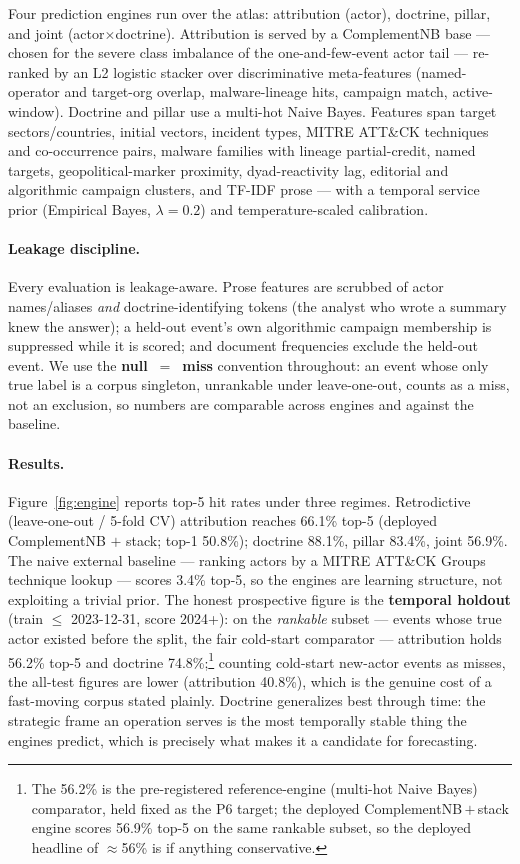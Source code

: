 \documentclass[11pt]{article}
\begin{document}
Four prediction engines run over the atlas: attribution (actor), doctrine, pillar, and joint
(actor$\times$doctrine). Attribution is served by a ComplementNB base \citep{rennie2003} --- chosen for
the severe class imbalance of the one-and-few-event actor tail --- re-ranked by an L2 logistic stacker
over discriminative meta-features (named-operator and target-org overlap, malware-lineage hits, campaign
match, active-window). Doctrine and pillar use a multi-hot Naive Bayes. Features span target
sectors/countries, initial vectors, incident types, MITRE ATT\&CK techniques \citep{mitreattack} and co-occurrence pairs,
malware families with lineage partial-credit, named targets, geopolitical-marker proximity,
dyad-reactivity lag, editorial and algorithmic campaign clusters, and TF-IDF prose --- with a temporal
service prior (Empirical Bayes, $\lambda=0.2$) and temperature-scaled calibration.

\paragraph{Leakage discipline.} Every evaluation is leakage-aware. Prose features are scrubbed of actor
names/aliases \emph{and} doctrine-identifying tokens (the analyst who wrote a summary knew the answer);
a held-out event's own algorithmic campaign membership is suppressed while it is scored; and document
frequencies exclude the held-out event. We use the \textbf{null~$=$~miss} convention throughout: an
event whose only true label is a corpus singleton, unrankable under leave-one-out, counts as a miss,
not an exclusion, so numbers are comparable across engines and against the baseline.

\paragraph{Results.} Figure~\ref{fig:engine} reports top-5 hit rates under three regimes. Retrodictive
(leave-one-out / 5-fold CV) attribution reaches 66.1\% top-5 (deployed ComplementNB $+$ stack; top-1
50.8\%); doctrine 88.1\%, pillar 83.4\%, joint 56.9\%. The naive external baseline --- ranking actors by
a MITRE ATT\&CK Groups technique lookup --- scores 3.4\% top-5, so the engines are learning structure,
not exploiting a trivial prior. The honest prospective figure is the \textbf{temporal holdout} (train
$\le$ 2023-12-31, score 2024+): on the \emph{rankable} subset --- events whose true actor existed before
the split, the fair cold-start comparator --- attribution holds 56.2\% top-5 and doctrine 74.8\%;\footnote{The 56.2\% is the pre-registered reference-engine (multi-hot Naive Bayes) comparator, held fixed as the P6 target; the deployed ComplementNB\,$+$\,stack engine scores 56.9\% top-5 on the same rankable subset, so the deployed headline of $\approx$56\% is if anything conservative.}
counting cold-start new-actor events as misses, the all-test figures are lower (attribution 40.8\%),
which is the genuine cost of a fast-moving corpus stated plainly. Doctrine generalizes best through
time: the strategic frame an operation serves is the most temporally stable thing the engines predict,
which is precisely what makes it a candidate for forecasting.
\end{document}
